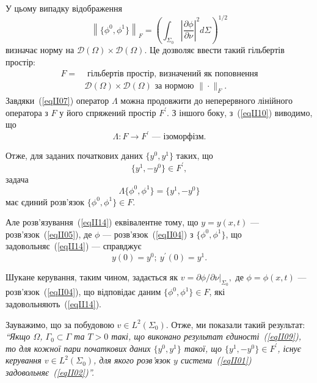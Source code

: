 \begin{remark}
У цьому випадку відображення
\begin{equation}\label{eqII10}
\left\| \{\phi^0, \phi^1\} \right\|_F = \left( \int_{\Sigma_0} \left| \frac{\partial \phi}{\partial \nu} \right|^2 d\Sigma \right)^{1/2}
\end{equation}
визначає норму на $\mathcal{D}(\Omega) \times \mathcal{D}(\Omega)$. Це дозволяє ввести такий гільбертів простір:
\begin{equation}\label{eqII11}
\begin{split}
F = &\text{ гільбертів простір, визначений як поповнення}
\\ &\mathcal{D}(\Omega) \times \mathcal{D}(\Omega) \text{ за нормою } \| \cdot \|_F.
\end{split}
\end{equation}
Завдяки~(\ref{eqII07}) оператор $\Lambda$ можна продовжити до неперервного лінійного оператора з $F$ у його спряжений простір $F^\prime$. З іншого боку, з~(\ref{eqII10}) виводимо, що
\begin{equation}\label{eqII12}
\Lambda : F \longrightarrow F^\prime \text{ — ізоморфізм.}
\end{equation}

Отже, для заданих початкових даних $\{y^0, y^1\}$ таких, що
\begin{equation}\label{eqII13}
\{y^1, -y^0\} \in F^\prime,
\end{equation}
задача
\begin{equation}\label{eqII14}
 \Lambda \{\phi^0, \phi^1\} =  \{y^1, -y^0\}
\end{equation}
має єдиний розв'язок $\{\phi^0, \phi^1\} \in F$.

Але розв'язування~(\ref{eqII14}) еквівалентне тому, що $y = y(x,t)$ — розв'язок~(\ref{eqII05}), де $\phi$ — розв'язок~(\ref{eqII04}) з $\{\phi^0, \phi^1\}$, що задовольняє~(\ref{eqII14}) — справджує
\begin{equation}\label{eqII15}
y(0) = y^0;\ y^\prime(0) = y^1.
\end{equation}

Шукане керування, таким чином, задається як
$
v = \partial \phi/\partial \nu\big|_{\Sigma_0},
$
де $\phi = \phi(x,t)$ — розв'язок~(\ref{eqII04}), що відповідає даним $\{\phi^0, \phi^1\} \in F$, які задовольняють~(\ref{eqII14}).

Зауважимо, що за побудовою
$
v \in L^2(\Sigma_0).
$
Отже, ми показали такий результат: \emph{``Якщо $\Omega$, $\Gamma_0 \subset \Gamma$ та $T>0$ такі, що виконано результат єдиності~(\ref{eqII09}), то для кожної пари початкових даних $\{y^0, y^1\}$ такої, що $\{y^1,-y^0\} \in F^\prime$, існує керування $v \in L^2(\Sigma_0)$, для якого розв'язок $y$ системи~(\ref{eqII01}) задовольняє~(\ref{eqII02})''.}



\end{remark}
